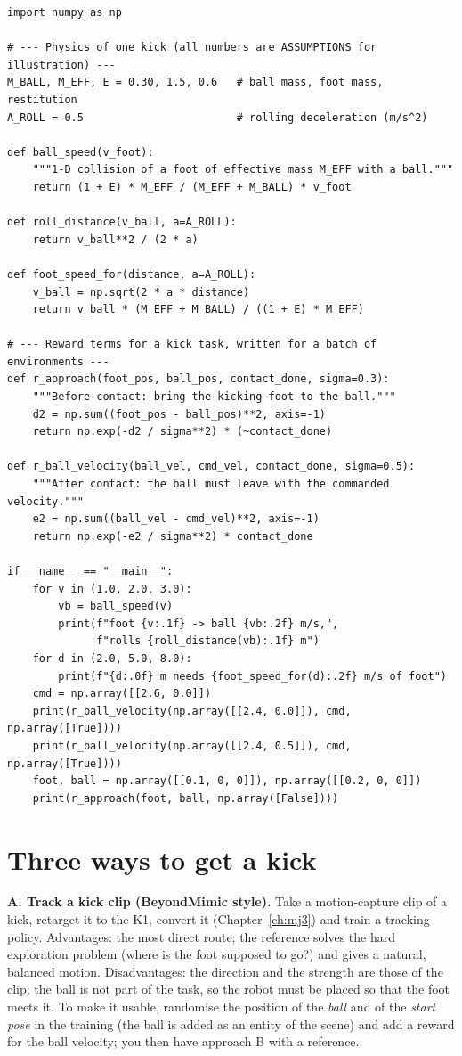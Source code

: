 \begin{verbatim}
import numpy as np

# --- Physics of one kick (all numbers are ASSUMPTIONS for illustration) ---
M_BALL, M_EFF, E = 0.30, 1.5, 0.6   # ball mass, foot mass, restitution
A_ROLL = 0.5                        # rolling deceleration (m/s^2)

def ball_speed(v_foot):
    """1-D collision of a foot of effective mass M_EFF with a ball."""
    return (1 + E) * M_EFF / (M_EFF + M_BALL) * v_foot

def roll_distance(v_ball, a=A_ROLL):
    return v_ball**2 / (2 * a)

def foot_speed_for(distance, a=A_ROLL):
    v_ball = np.sqrt(2 * a * distance)
    return v_ball * (M_EFF + M_BALL) / ((1 + E) * M_EFF)

# --- Reward terms for a kick task, written for a batch of environments ---
def r_approach(foot_pos, ball_pos, contact_done, sigma=0.3):
    """Before contact: bring the kicking foot to the ball."""
    d2 = np.sum((foot_pos - ball_pos)**2, axis=-1)
    return np.exp(-d2 / sigma**2) * (~contact_done)

def r_ball_velocity(ball_vel, cmd_vel, contact_done, sigma=0.5):
    """After contact: the ball must leave with the commanded velocity."""
    e2 = np.sum((ball_vel - cmd_vel)**2, axis=-1)
    return np.exp(-e2 / sigma**2) * contact_done

if __name__ == "__main__":
    for v in (1.0, 2.0, 3.0):
        vb = ball_speed(v)
        print(f"foot {v:.1f} -> ball {vb:.2f} m/s,",
              f"rolls {roll_distance(vb):.1f} m")
    for d in (2.0, 5.0, 8.0):
        print(f"{d:.0f} m needs {foot_speed_for(d):.2f} m/s of foot")
    cmd = np.array([[2.6, 0.0]])
    print(r_ball_velocity(np.array([[2.4, 0.0]]), cmd, np.array([True])))
    print(r_ball_velocity(np.array([[2.4, 0.5]]), cmd, np.array([True])))
    foot, ball = np.array([[0.1, 0, 0]]), np.array([[0.2, 0, 0]])
    print(r_approach(foot, ball, np.array([False])))
\end{verbatim}

\section*{Three ways to get a kick}
\textbf{A. Track a kick clip (BeyondMimic style).} Take a motion-capture clip of a kick, retarget it to the K1, convert it (Chapter~\ref{ch:mj3}) and train a tracking policy. Advantages: the most direct route; the reference solves the hard exploration problem (where is the foot supposed to go?) and gives a natural, balanced motion. Disadvantages: the direction and the strength are those of the clip; the ball is not part of the task, so the robot must be placed so that the foot meets it. To make it usable, randomise the position of the \emph{ball} and of the \emph{start pose} in the training (the ball is added as an entity of the scene) and add a reward for the ball velocity; you then have approach B with a reference.

